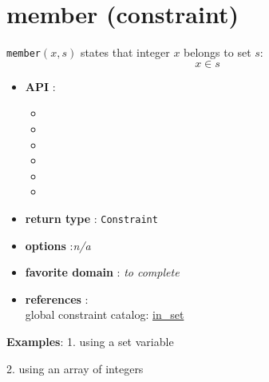 \label{member}
\hypertarget{member}{}

\section{member (constraint)}\label{member:memberconstraint}\hypertarget{member:memberconstraint}{}

\begin{notedef}
  \texttt{member}$(x,s)$ states that integer $x$ belongs to set $s$:
$$x\in s$$
\end{notedef}

\begin{itemize}
	\item \textbf{API} :
	\begin{itemize}
		\item {}
		\item {}
		\item {}
		\item {}
		\item {}
		\item {}
	\end{itemize}
	\item \textbf{return type} : \texttt{Constraint}
	\item \textbf{options} :\emph{n/a}
	\item \textbf{favorite domain} : \emph{to complete}
	\item \textbf{references} :\\
      global constraint catalog: \href{http://www.emn.fr/x-info/sdemasse/gccat/Cin_set.html}{in\_set}
\end{itemize}

\textbf{Examples}:
1. using a set variable


2. using an array of integers

